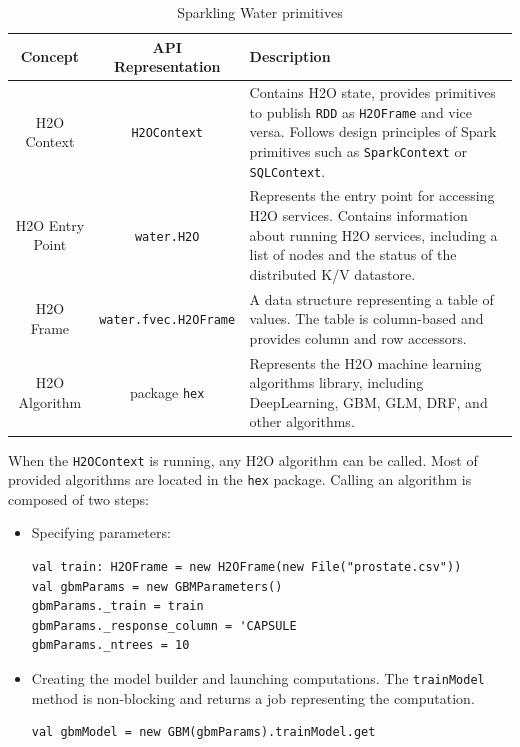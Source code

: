\documentclass{standalone}
\begin{document}
\begin{table}[!ht]
\centering
\begin{tabular}{c c p{5.2cm}}
\toprule
Concept & API Representation & Description \\
\midrule
H2O Context & \texttt{H2OContext} & Contains
H2O state, provides primitives to publish \texttt{RDD} as \texttt{H2OFrame} and
vice versa. Follows design principles of Spark primitives such as
\texttt{SparkContext} or \texttt{SQLContext}. \\ \addlinespace

H2O Entry Point & \texttt{water.H2O} & Represents the entry point for accessing
H2O services. Contains information about running H2O services, including a list of
nodes and the status of the distributed K/V datastore. \\  \addlinespace

H2O Frame &  \small{\texttt{water.fvec.H2OFrame}} & A data structure 
representing a table of values. The table is column-based and provides column and
row accessors. \\  \addlinespace

H2O Algorithm & package \texttt{hex} & Represents the H2O machine learning
algorithms library, including DeepLearning, GBM, GLM, DRF, and other
algorithms. \\

\bottomrule
\end{tabular} 
\caption{Sparkling Water primitives}
\label{tab:primitives}
\end{table}

\pagebreak
When the \texttt{H2OContext} is running, any H2O algorithm can be called. Most of provided algorithms are located in the \texttt{hex} package. Calling an algorithm is composed of two steps:

\begin{itemize}
	\item Specifying parameters:
\begin{lstlisting}[style=Scala]
val train: H2OFrame = new H2OFrame(new File("prostate.csv"))
val gbmParams = new GBMParameters()
gbmParams._train = train
gbmParams._response_column = 'CAPSULE
gbmParams._ntrees = 10
\end{lstlisting}

	\item Creating the model builder and launching computations. The \texttt{trainModel} method is non-blocking and returns a job representing the computation.
\begin{lstlisting}[style=Scala]
val gbmModel = new GBM(gbmParams).trainModel.get
\end{lstlisting}
\end{itemize}
\end{document}
